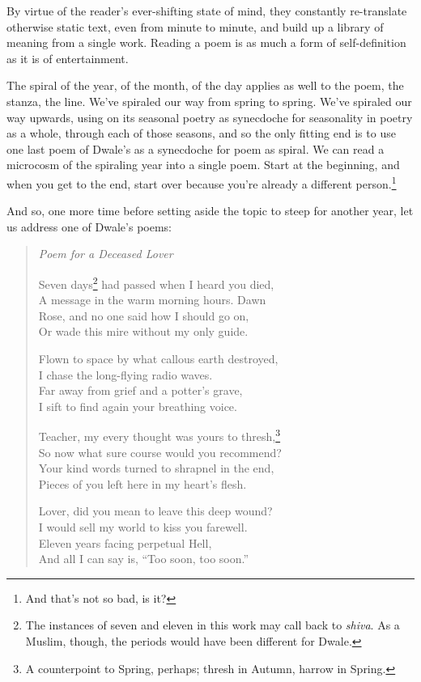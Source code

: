 \documentclass[12pt]{memoir}
\begin{document}
By virtue of the reader's ever-shifting state of mind, they constantly re-translate otherwise static text, even from minute to minute, and build up a library of meaning from a single work. Reading a poem is as much a form of self-definition as it is of entertainment.

The spiral of the year, of the month, of the day applies as well to the poem, the stanza, the line. We've spiraled our way from spring to spring. We've spiraled our way upwards, using on its seasonal poetry as synecdoche for seasonality in poetry as a whole, through each of those seasons, and so the only fitting end is to use one last poem of Dwale's as a synecdoche for poem as spiral. We can read a microcosm of the spiraling year into a single poem. Start at the beginning, and when you get to the end, start over because you're already a different person.\footnote{And that's not so bad, is it?}

And so, one more time before setting aside the topic to steep for another year, let us address one of Dwale's poems:

\begin{verse}
\emph{Poem for a Deceased Lover}

Seven days\footnote{The instances of seven and eleven in this work may call back to \emph{shiva}. As a Muslim, though, the periods would have been different for Dwale.} had passed when I heard you died, \\
A message in the warm morning hours. Dawn \\
Rose, and no one said how I should go on, \\
Or wade this mire without my only guide.

Flown to space by what callous earth destroyed, \\
I chase the long-flying radio waves. \\
Far away from grief and a potter's grave, \\
I sift to find again your breathing voice.

Teacher, my every thought was yours to thresh,\footnote{A counterpoint to Spring, perhaps; thresh in Autumn, harrow in Spring.} \\
So now what sure course would you recommend? \\
Your kind words turned to shrapnel in the end, \\
Pieces of you left here in my heart's flesh.

Lover, did you mean to leave this deep wound? \\
I would sell my world to kiss you farewell. \\
Eleven years facing perpetual Hell, \\
And all I can say is, ``Too soon, too soon.''

\parencite[14]{leaves}
\end{verse}
\end{document}
